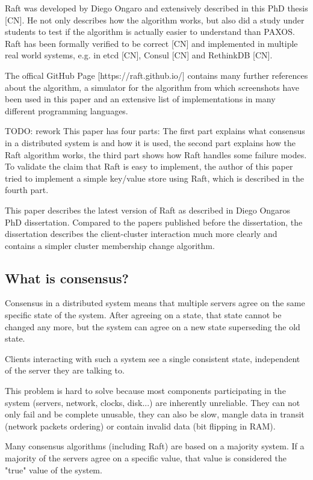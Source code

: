 Raft was developed by Diego Ongaro and extensively described in this PhD thesis [CN]. He not only describes how the algorithm works, but also did a study under students to test if the algorithm is actually easier to understand than PAXOS. Raft has been formally verified to be correct [CN] and implemented in multiple real world systems, e.g. in etcd [CN], Consul [CN] and RethinkDB [CN].

The offical GitHub Page [https://raft.github.io/] contains many further references about the algorithm, a simulator for the algorithm from which screenshots have been used in this paper and an extensive list of implementations in many different programming languages.

TODO: rework
This paper has four parts: The first part explains what consensus in a distributed system is and how it is used, the second part explains how the Raft algorithm works, the third part shows how Raft handles some failure modes. To validate the claim that Raft is easy to implement, the author of this paper tried to implement a simple key/value store using Raft, which is described in the fourth part.

This paper describes the latest version of Raft as described in Diego Ongaros PhD dissertation. Compared to the papers published before the dissertation, the dissertation describes the client-cluster interaction much more clearly and contains a simpler cluster membership change algorithm.

\subsection{What is consensus?}

Consensus in a distributed system means that multiple servers agree on the same specific state of the system. After agreeing on a state, that state cannot be changed any more, but the system can agree on a new state superseding the old state.

Clients interacting with such a system see a single consistent state, independent of the server they are talking to.

This problem is hard to solve because most components participating in the system (servers, network, clocks, disk...) are inherently unreliable. They can not only fail and be complete unusable, they can also be slow, mangle data in transit (network packets ordering) or contain invalid data (bit flipping in RAM).

Many consensus algorithms (including Raft) are based on a majority system. If a majority of the servers agree on a specific value, that value is considered the "true" value of the system.

